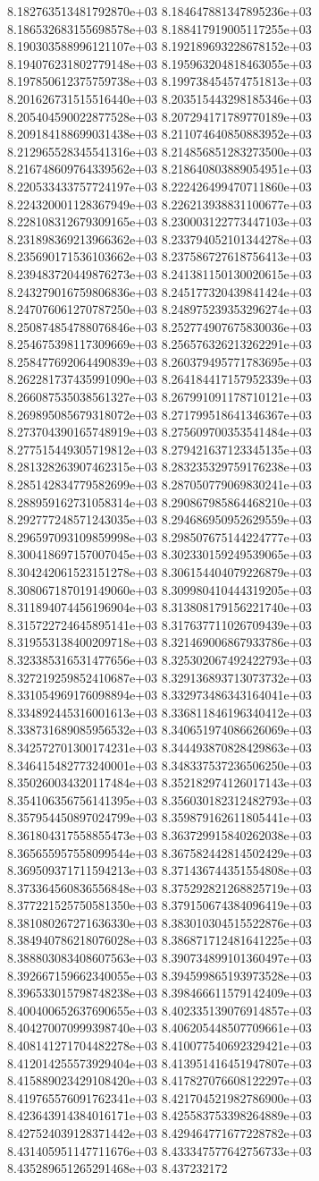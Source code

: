 8.182763513481792870e+03	8.184647881347895236e+03	8.186532683155698578e+03	8.188417919005117255e+03	8.190303588996121107e+03	8.192189693228678152e+03	8.194076231802779148e+03	8.195963204818463055e+03	8.197850612375759738e+03	8.199738454574751813e+03	8.201626731515516440e+03	8.203515443298185346e+03	8.205404590022877528e+03	8.207294171789770189e+03	8.209184188699031438e+03	8.211074640850883952e+03	8.212965528345541316e+03	8.214856851283273500e+03	8.216748609764339562e+03	8.218640803889054951e+03	8.220533433757724197e+03	8.222426499470711860e+03	8.224320001128367949e+03	8.226213938831100677e+03	8.228108312679309165e+03	8.230003122773447103e+03	8.231898369213966362e+03	8.233794052101344278e+03	8.235690171536103662e+03	8.237586727618756413e+03	8.239483720449876273e+03	8.241381150130020615e+03	8.243279016759806836e+03	8.245177320439841424e+03	8.247076061270787250e+03	8.248975239353296274e+03	8.250874854788076846e+03	8.252774907675830036e+03	8.254675398117309669e+03	8.256576326213262291e+03	8.258477692064490839e+03	8.260379495771783695e+03	8.262281737435991090e+03	8.264184417157952339e+03	8.266087535038561327e+03	8.267991091178710121e+03	8.269895085679318072e+03	8.271799518641346367e+03	8.273704390165748919e+03	8.275609700353541484e+03	8.277515449305719812e+03	8.279421637123345135e+03	8.281328263907462315e+03	8.283235329759176238e+03	8.285142834779582699e+03	8.287050779069830241e+03	8.288959162731058314e+03	8.290867985864468210e+03	8.292777248571243035e+03	8.294686950952629559e+03	8.296597093109859998e+03	8.298507675144224777e+03	8.300418697157007045e+03	8.302330159249539065e+03	8.304242061523151278e+03	8.306154404079226879e+03	8.308067187019149060e+03	8.309980410444319205e+03	8.311894074456196904e+03	8.313808179156221740e+03	8.315722724645895141e+03	8.317637711026709439e+03	8.319553138400209718e+03	8.321469006867933786e+03	8.323385316531477656e+03	8.325302067492422793e+03	8.327219259852410687e+03	8.329136893713073732e+03	8.331054969176098894e+03	8.332973486343164041e+03	8.334892445316001613e+03	8.336811846196340412e+03	8.338731689085956532e+03	8.340651974086626069e+03	8.342572701300174231e+03	8.344493870828429863e+03	8.346415482773240001e+03	8.348337537236506250e+03	8.350260034320117484e+03	8.352182974126017143e+03	8.354106356756141395e+03	8.356030182312482793e+03	8.357954450897024799e+03	8.359879162611805441e+03	8.361804317558855473e+03	8.363729915840262038e+03	8.365655957558099544e+03	8.367582442814502429e+03	8.369509371711594213e+03	8.371436744351554808e+03	8.373364560836556848e+03	8.375292821268825719e+03	8.377221525750581350e+03	8.379150674384096419e+03	8.381080267271636330e+03	8.383010304515522876e+03	8.384940786218076028e+03	8.386871712481641225e+03	8.388803083408607563e+03	8.390734899101360497e+03	8.392667159662340055e+03	8.394599865193973528e+03	8.396533015798748238e+03	8.398466611579142409e+03	8.400400652637690655e+03	8.402335139076914857e+03	8.404270070999398740e+03	8.406205448507709661e+03	8.408141271704482278e+03	8.410077540692329421e+03	8.412014255573929404e+03	8.413951416451947807e+03	8.415889023429108420e+03	8.417827076608122297e+03	8.419765576091762341e+03	8.421704521982786900e+03	8.423643914384016171e+03	8.425583753398264889e+03	8.427524039128371442e+03	8.429464771677228782e+03	8.431405951147711676e+03	8.433347577642756733e+03	8.435289651265291468e+03	8.437232172